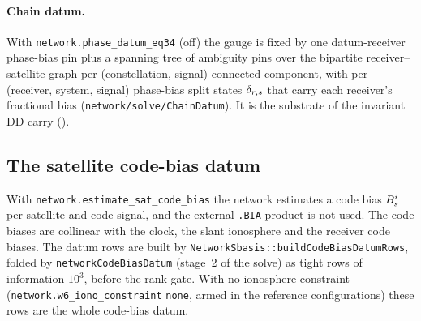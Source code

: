 \documentclass[main.tex]{subfiles}
\begin{document}
\paragraph{Chain datum.}
With \texttt{network.phase\_datum\_eq34} (off) the gauge is fixed by one
datum-receiver phase-bias pin plus a spanning tree of ambiguity pins over
the bipartite receiver--satellite graph per (constellation, signal)
connected component, with per-(receiver, system, signal) phase-bias
split states $\delta_{r,s}$ that carry each receiver's fractional
bias (\texttt{network/solve/ChainDatum}). It is the substrate of the
invariant DD carry ().

\subsection{The satellite code-bias datum}\label{sec:net-cbdatum}

With \texttt{network.estimate\_sat\_code\_bias} the network estimates a
code bias $B^i_s$ per satellite and code signal, and
the external \texttt{.BIA} product is not used. The code biases are
collinear with the clock, the slant ionosphere and the receiver code
biases. The datum rows are built by
\texttt{NetworkSbasis::buildCodeBiasDatumRows}, folded by
\texttt{networkCodeBiasDatum} (stage~2 of the solve) as tight rows of
information $10^{3}$, before the rank gate. With no ionosphere constraint
(\texttt{network.w6\_iono\_constraint} \texttt{none}, armed in the
reference configurations) these rows are the whole code-bias datum.
\end{document}
